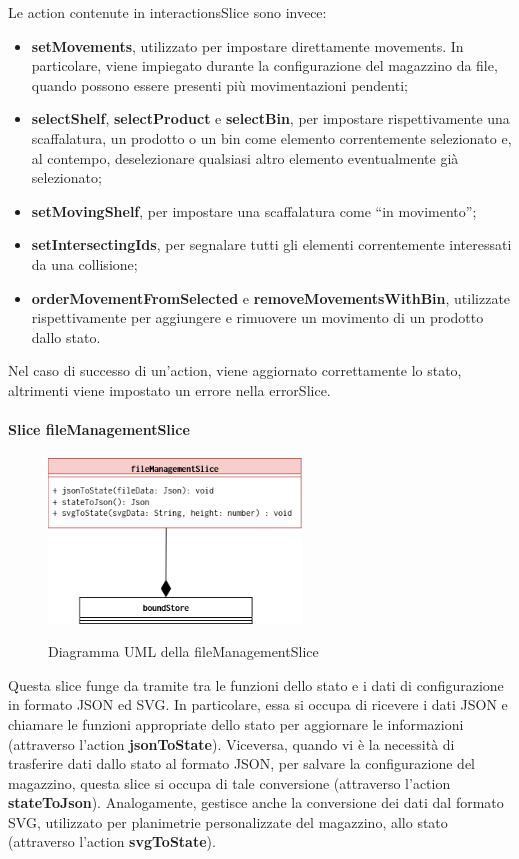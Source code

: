 \noindent Le action contenute in interactionsSlice sono invece:
\begin{itemize}
    \item \textbf{setMovements}, utilizzato per impostare direttamente movements. In particolare, viene impiegato durante la configurazione del magazzino da file, quando possono essere presenti più movimentazioni pendenti;
    \item \textbf{selectShelf}, \textbf{selectProduct} e \textbf{selectBin}, per impostare rispettivamente una scaffalatura, un prodotto o un bin come elemento correntemente selezionato e, al contempo, deselezionare qualsiasi altro elemento eventualmente già selezionato;
    \item \textbf{setMovingShelf}, per impostare una scaffalatura come ``in movimento'';
    \item \textbf{setIntersectingIds}, per segnalare tutti gli elementi correntemente interessati da una collisione;
    \item \textbf{orderMovementFromSelected} e \textbf{removeMovementsWithBin},  utilizzate rispettivamente per aggiungere e rimuovere un movimento di un prodotto dallo stato.
\end{itemize}
Nel caso di successo di un'action, viene aggiornato correttamente lo stato, altrimenti viene impostato un errore nella errorSlice.

\paragraph{Slice fileManagementSlice}
\begin{figure}[H]
    \centering
    \includegraphics[width=0.6\textwidth]{images/UML/feature_model_fileManagement.drawio.png}
    \label{fig:UML_fileManagementSlice}
    \caption{Diagramma UML della fileManagementSlice}
\end{figure}
Questa slice funge da tramite tra le funzioni dello stato e i dati di configurazione in formato JSON ed SVG. In particolare, essa si occupa di ricevere i dati JSON e chiamare le funzioni appropriate dello stato per aggiornare le informazioni (attraverso l'action \textbf{jsonToState}). Viceversa, quando vi è la necessità di trasferire dati dallo stato al formato JSON, per salvare la configurazione del magazzino, questa slice si occupa di tale conversione (attraverso l'action \textbf{stateToJson}). Analogamente, gestisce anche la conversione dei dati dal formato SVG, utilizzato per planimetrie personalizzate del magazzino, allo stato (attraverso l'action \textbf{svgToState}).

